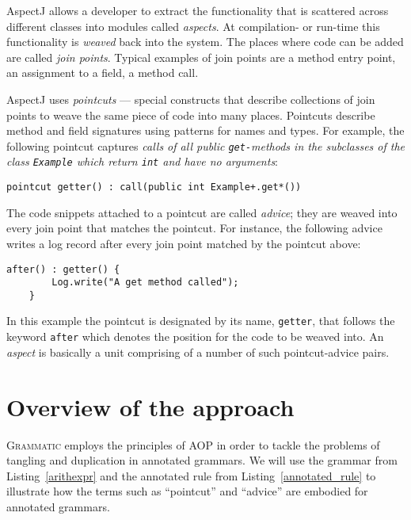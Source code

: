 \documentclass{IOS-Book-Article}     %
\newcommand{\lstref}[1]{Listing~\ref{#1}}
\newcommand{\tool}[1]{\textsc{#1}}
\newcommand{\Grammatic}[0]{\tool{Grammatic}}
\begin{document}
AspectJ allows a developer to extract the functionality that is scattered across different classes into modules called \emph{aspects}. At compilation- or run-time this functionality is \emph{weaved} back into the system. The places where code can be added are called \emph{join points}. Typical examples of join points are a method entry point, an assignment to a field, a method call. 

AspectJ uses \emph{pointcuts} --- special constructs that describe collections of join points to weave the same piece of code into many places. Pointcuts describe method and field signatures using patterns for names and types. For example, the following pointcut captures \textit{calls of all public \texttt{get-}methods in the subclasses of the class \texttt{Example} which return \texttt{int} and have no arguments}:
\begin{lstlisting}[language={[AspectJ]Java}]
    pointcut getter() : call(public int Example+.get*())
\end{lstlisting}

The code snippets attached to a pointcut are called \emph{advice}; they are weaved into every join point that matches the pointcut. For instance, the following advice writes a log record after every join point matched by the pointcut above:
\begin{lstlisting}[language={[AspectJ]Java}]
    after() : getter() {
        Log.write("A get method called");
    }
\end{lstlisting}
In this example the pointcut is designated by its name, \texttt{getter}, that follows the keyword \texttt{after} which denotes the position for the code to be weaved into.
An \emph{aspect} is basically a unit comprising of a number of such pointcut-advice pairs.

\section{Overview of the approach}\label{Approach}

\Grammatic{} employs the principles of AOP in order to tackle the problems of tangling and duplication in annotated grammars. We will use the grammar from \lstref{arithexpr} and the annotated rule from \lstref{annotated_rule} to illustrate how the terms such as ``pointcut'' and ``advice'' are embodied for annotated grammars. 
\end{document}
